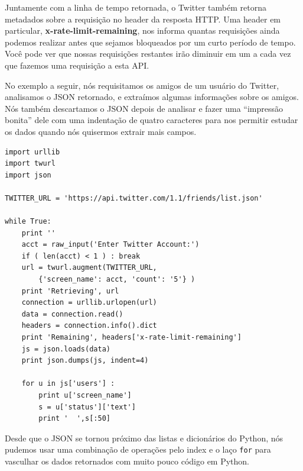 Juntamente com a linha de tempo retornada, o Twitter também 
retorna metadados sobre a requisição no header da resposta HTTP.
Uma header em particular, {\bf x-rate-limit-remaining}, nos 
informa quantas requisições ainda podemos realizar antes que sejamos
bloqueados por um curto período de tempo. Você pode ver que nossas
requisições restantes irão diminuir em um a cada vez que fazemos 
uma requisição a esta API.

No exemplo a seguir, nós requisitamos os amigos de um usuário do
Twitter, analisamos o JSON retornado, e extraímos algumas informações
sobre os amigos. Nós também descartamos o JSON depois de analisar e
fazer uma ``impressão bonita'' dele com uma indentação de quatro
caracteres para nos permitir estudar os dados quando nós quisermos
extrair mais campos.

\beforeverb
\begin{verbatim}
import urllib
import twurl
import json

TWITTER_URL = 'https://api.twitter.com/1.1/friends/list.json'

while True:
    print ''
    acct = raw_input('Enter Twitter Account:')
    if ( len(acct) < 1 ) : break
    url = twurl.augment(TWITTER_URL,
        {'screen_name': acct, 'count': '5'} )
    print 'Retrieving', url
    connection = urllib.urlopen(url)
    data = connection.read()
    headers = connection.info().dict
    print 'Remaining', headers['x-rate-limit-remaining']
    js = json.loads(data)
    print json.dumps(js, indent=4)

    for u in js['users'] :
        print u['screen_name']
        s = u['status']['text']
        print '  ',s[:50]
\end{verbatim}
\afterverb

Desde que o JSON se tornou próximo das listas e dicionários do Python,
nós pudemos usar uma combinação de operações pelo index e o laço
{\tt for} para vasculhar os dados retornados com muito pouco 
código em Python.

